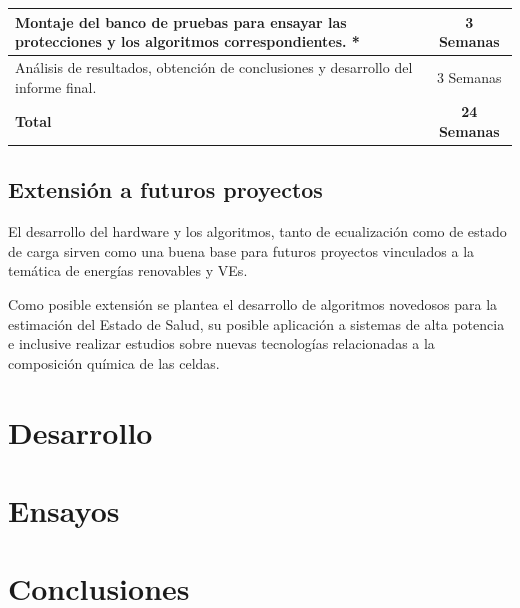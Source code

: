 \documentclass[10pt,a4paper]{article}
\begin{document}
\begin{table}[h!]
\begin{tabular}{|l|c|}
			Montaje del banco de pruebas para ensayar las protecciones y los algoritmos correspondientes. *                                                                                                                       & 3 Semanas                          \\ \hline
			Análisis de resultados, obtención de conclusiones y desarrollo del informe final.                                                                                                                                                       & 3 Semanas                          \\ \hline
			\textbf{Total}                                                                                                                                                                                                  &\textbf{24 Semanas} \\ \hline
		\end{tabular}
	\end{table}
	
	\subsection{Extensión a futuros proyectos}
	
	El desarrollo del hardware y los algoritmos, tanto de ecualización como de estado de carga sirven como una buena base para futuros proyectos vinculados a la temática de energías renovables y \acrshort{VE}s.
	
	Como posible extensión se plantea el desarrollo de algoritmos novedosos para la estimación del Estado de Salud, su posible aplicación a sistemas de alta potencia e inclusive realizar estudios sobre nuevas tecnologías relacionadas a la composición química de las celdas.
	
	\newpage

    \section{Desarrollo}\label{desarrollo}
    \newpage
    
    \section{Ensayos}\label{ensayos}
    \newpage

    \section{Conclusiones}\label{conclusiones}
    \printbibliography

    \newpage
    \glsaddall
    \printnoidxglossary[type=\acronymtype,title={Abreviaturas}]
\end{document}
